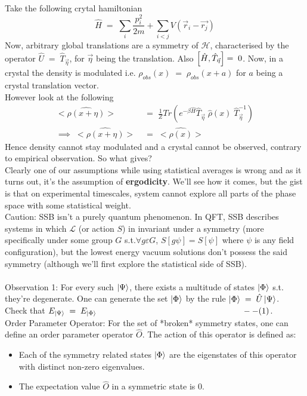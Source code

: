 \documentclass[12pt]{article}
\begin{document}
Take the following crytal hamiltonian
$$\hat{H}\;=\;\sum_i \frac{p_i^2}{2m}+\sum_{i<j}V(\Vec{r}_i-\Vec{r_j})$$
Now, arbitrary global translations are a symmetry of $\mathcal{H}$, characterised by the operator $\hat{U}\;=\;\hat{T}_{\Vec{\eta}}$, for $\Vec{\eta}$ being the translation. Also $\comm{\hat{H}}{\hat{T}_{\Vec{\eta}}}=\;0$. Now, in a crystal the density is modulated i.e. $\rho_{obs}(x)\;=\;\rho_{obs}(x+a)$ for $a$ being a crystal translation vector.\\
However look at the following
\begin{align*}
    <\hat{\rho(x+\eta)}> &= \;\frac{1}{Z}Tr(e^{-\beta \hat{H}}\hat{T}_{\Vec{\eta}}\;\hat{\rho}(x)\;\hat{T}^{-1}_{\Vec{\eta}} ) \\
    \implies\; <\hat{\rho(x+\eta)}>\;&=\; <\hat{\rho(x)}>
\end{align*}
Hence density cannot stay modulated and a crystal cannot be observed, contrary to empirical observation. So what gives?\\
Clearly one of our assumptions while using statistical averages is wrong and as it turns out, it's the assumption of \textbf{ergodicity}. We'll see how it comes, but the gist is that on experimental timescales, system cannot explore all parts of the phase space with some statistical weight.\\
Caution: SSB isn't a purely quantum phenomenon.
\newline
In QFT, SSB describes systems in which $\mathcal{L}$ (or action $S$) in invariant under a symmetry (more specifically under some group $G$ s.t.$\forall g\varepsilon G$, $S[g\psi] =  S[\psi]$ where $ \psi$ is any field configuration), but the lowest energy vacuum solutions don't possess the said symmetry (although we'll first explore the statistical side of SSB).\\
\\
Observation 1: For every such $\ket{\Psi}$, there exists a multitude of states $\ket{\Phi}$ s.t. they're degenerate.
One can generate the set {$\ket{\Phi}$} by the rule $\ket{\Phi}\;=\;\hat{U}\ket{\Psi}$.\\
Check that $E_{\ket{\Psi}}\;=\;E_{\ket{\Phi}}\;\;\;\;\;\;\;\;\;\;\;\;\;\;\;\;\;\;\;\;\;\;\;\;\;\;\;\;\;\;\;\;\;\;\;\;\;\;\;\;\;\;\;\;\;\;\;\;\;\;\;\;\;\;\;\;\;\;\;\;\;\;\;--(1)$.\\
\newline
Order Parameter Operator: For the set of *broken* symmetry states, one can define an order parameter operator $\hat{O}$.
The action of this operator is defined as:
\begin{itemize}
    \item
        Each of the symmetry related states {$\ket{\Phi}$} are the eigenstates of this operator with distinct non-zero eigenvalues.
    \item The expectation value $\hat{O}$ in a symmetric state is 0.
\end{itemize}
\end{document}
